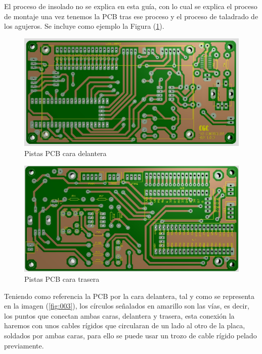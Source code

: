 \documentclass[10pt,a4paper,oneside]{article}
\begin{document}
El proceso de insolado no se explica en esta guía, con lo cual se explica el proceso de montaje una vez tenemos la PCB tras ese proceso y el proceso de taladrado de los agujeros. Se incluye como ejemplo la Figura (\ref{fig:001}).

\begin{figure}[H]
\centering
\includegraphics[scale=0.5]{Imagenes/PCB_CARA_DELANTERA.jpg}
\caption[Vista de las pistas de la cara delantera de la PCB tras el proceso de insolado]{Pistas PCB cara delantera}
\label{fig:001}
\end{figure}

\begin{figure}[H]
\centering
\includegraphics[scale=0.5]{Imagenes/PCB_CARA_TRASERA.jpg}
\caption[Vista de las pistas de la cara trasera de la PCB tras el proceso de insolado]{Pistas PCB cara trasera}
\label{fig:002}
\end{figure}

Teniendo como referencia la PCB por la cara delantera,  tal y como se representa en la imagen (\ref{fig:003}), los círculos señalados en amarillo son las vías, es decir, los puntos que conectan ambas caras, delantera y trasera, esta conexión la haremos con unos cables rígidos que circularan de un lado al otro de la placa, soldados por ambas caras, para ello se puede usar un trozo de cable rígido pelado previamente. 
\end{document}
